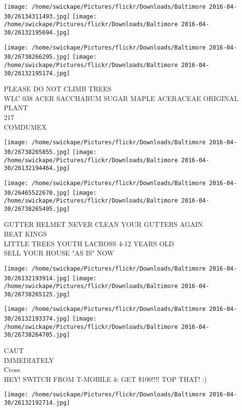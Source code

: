 \documentclass[10pt,letterpaper]{article}
\begin{document}
\texttt{[image: /home/swickape/Pictures/flickr/Downloads/Baltimore 2016-04-30/26134311493.jpg]}
\texttt{[image: /home/swickape/Pictures/flickr/Downloads/Baltimore 2016-04-30/26132195694.jpg]}

\texttt{[image: /home/swickape/Pictures/flickr/Downloads/Baltimore 2016-04-30/26738266295.jpg]}
\texttt{[image: /home/swickape/Pictures/flickr/Downloads/Baltimore 2016-04-30/26132195174.jpg]}

PLEASE DO NOT CLIMB TREES\\
WLC 038 ACER SACCHARUM SUGAR MAPLE ACERACEAE ORIGINAL PLANT\\
217\\
COMDUMEX\\
\pagebreak

\texttt{[image: /home/swickape/Pictures/flickr/Downloads/Baltimore 2016-04-30/26738265855.jpg]}
\texttt{[image: /home/swickape/Pictures/flickr/Downloads/Baltimore 2016-04-30/26132194464.jpg]}

\texttt{[image: /home/swickape/Pictures/flickr/Downloads/Baltimore 2016-04-30/26465522670.jpg]}
\texttt{[image: /home/swickape/Pictures/flickr/Downloads/Baltimore 2016-04-30/26738265495.jpg]}

GUTTER HELMET NEVER CLEAN YOUR GUTTERS AGAIN\\
BEAT KINGS\\
LITTLE TREES YOUTH LACROSS 4{-}12 YEARS OLD\\
SELL YOUR HOUSE "AS IS" NOW\\
\pagebreak

\texttt{[image: /home/swickape/Pictures/flickr/Downloads/Baltimore 2016-04-30/26132193914.jpg]}
\texttt{[image: /home/swickape/Pictures/flickr/Downloads/Baltimore 2016-04-30/26738265125.jpg]}

\texttt{[image: /home/swickape/Pictures/flickr/Downloads/Baltimore 2016-04-30/26132193374.jpg]}
\texttt{[image: /home/swickape/Pictures/flickr/Downloads/Baltimore 2016-04-30/26738264705.jpg]}

CAUT\\
IMMEDIATELY\\
Cross\\
HEY!  SWITCH FROM T{-}MOBILE \& GET \$100!!!! TOP THAT! :)\\
\pagebreak

\texttt{[image: /home/swickape/Pictures/flickr/Downloads/Baltimore 2016-04-30/26132192714.jpg]}
\end{document}
